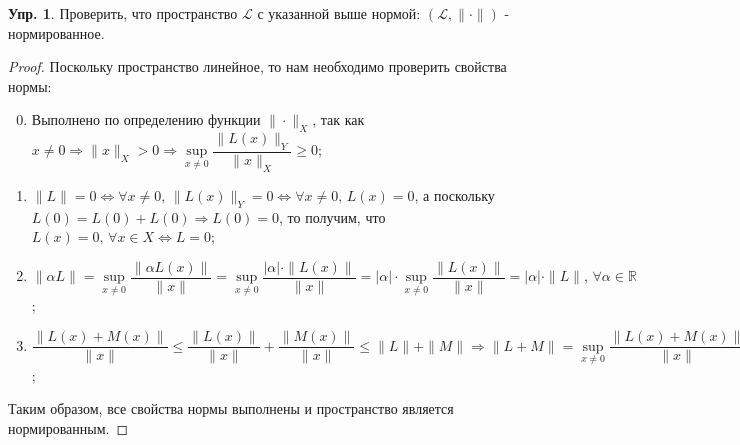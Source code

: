 \documentclass[12pt]{article}
\newcommand{\MR}{\mathbb{R}}
\theoremstyle{definition}
\newtheorem{exrc}{Упр.}
\begin{document}
\begin{exrc}
	Проверить, что пространство $\mathcal{L}$ с указанной выше нормой: $(\mathcal{L}, \| \cdot \|)$ - нормированное.
\end{exrc}
\begin{proof}
	Поскольку пространство линейное, то нам необходимо проверить свойства нормы:
	\begin{enumerate}[label ={(\arabic*)}]
		\setcounter{enumi}{-1}
		\item Выполнено по определению функции $\|\cdot\|_X$, так как $x \neq 0 \Rightarrow \|x\|_X > 0 \Rightarrow \sup\limits_{x \neq 0} \dfrac{\|L(x)\|_Y}{\|x\|_X} \geq 0$;
		
		\item $\|L\| = 0 \Leftrightarrow \forall x \neq 0, \, \|L(x)\|_Y = 0 \Leftrightarrow  \forall x \neq 0, \, L(x) = 0$, а поскольку $L(0) = L(0) + L(0) \Rightarrow L(0) = 0$, то получим, что $L(x) = 0, \, \forall x \in X \Leftrightarrow L = 0$;
		
		\item $\|\alpha L\| = \sup\limits_{x \neq 0} \dfrac{\|\alpha L(x)\|}{\|x\|} = \sup\limits_{x \neq 0} \dfrac{|\alpha|{\cdot}\| L(x)\|}{\|x\|} = |\alpha|{\cdot}\sup\limits_{x \neq 0} \dfrac{\|L(x)\|}{\|x\|} = |\alpha|{\cdot}\|L\|, \, \forall \alpha \in \MR$;
		\item $\dfrac{\|L(x) + M(x)\|}{\|x\|} \leq \dfrac{\|L(x)\|}{\|x\|} + \dfrac{\| M(x)\|}{\|x\|} \leq \|L\| + \|M\| \Rightarrow \|L + M\| = \sup\limits_{x \neq 0} \dfrac{\|L(x) + M(x)\|}{\|x\|} \leq \|L\| + \|M\|$;
	\end{enumerate}
	Таким образом, все свойства нормы выполнены и пространство является нормированным.
\end{proof}
\end{document}
